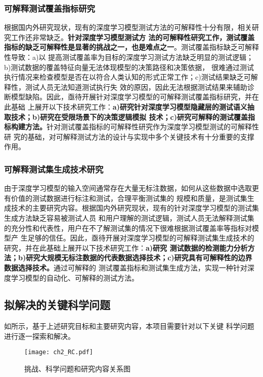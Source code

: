 \subsubsection{可解释测试覆盖指标研究}
根据国内外研究现状，现有的深度学习模型测试方法的可解释性十分有限，相关研究工作还非常缺乏。\textbf{针对深度学习模型测试方
    法的可解释性研究工作，测试覆盖指标的缺乏可解释性是显著的挑战之一，也是难点之一}。测试覆盖指标缺乏可解释性导致：a)以
提高测试覆盖率为目标的深度学习测试方法缺乏明显的测试逻辑；b)测试数据的覆盖特征向量无法体现模型的决策路径和决策依据，
很难通过测试执行情况来检查模型是否在以符合人类认知的形式正常工作；c)测试结果缺乏可解释性，测试人员无法知道测试执行失
效的原因，因此无法根据测试结果来辅助诊断模型缺陷。因此，亟待开展针对深度学习模型的可解释测试覆盖指标研究，并在此基础
上展开以下技术研究工作：\textbf{a)研究针对深度学习模型隐藏层的测试语义抽取技术；b)研究在受限场景下的决策逻辑模拟
    技术；c)研究可解释的测试覆盖指标构建方法。}针对测试覆盖指标的可解释性研究作为深度学习模型测试的可解释性研
究的基础，对可解释测试方法的设计与实现中多个关键技术有十分重要的支撑作用。

\subsubsection{可解释测试集生成技术研究}
由于深度学习模型的输入空间通常存在大量无标注数据，如何从这些数据中选取更有价值的测试数据进行标注和测试，合理平衡测试集的
规模和质量，是测试集生成技术的主要研究内容。根据国内外研究现状，现有的针对深度学习模型的测试集生成方法缺乏容易被测试人员
和用户理解的测试逻辑，测试人员无法解释测试集的充分性和代表性，用户在不了解测试集的情况下很难根据测试覆盖率等指标对模型产
生足够的信任。因此，亟待开展对深度学习模型的可解释测试集生成技术的研究，并在此基础上展开以下技术研究工作：\textbf{a)研究
    测试数据的检测能力分析方法；b)研究大规模无标注数据的代表数据选择技术；c)研究具有可解释性的边界数据选择技术。}通过可解释的
    测试覆盖指标和测试集生成方法，实现一种针对深度学习模型的自动化、可解释的测试方法。


\subsection{拟解决的关键科学问题}

如所示，基于上述研究目标和主要研究内容，本项目需要针对以下关键
科学问题进行逐一探索和解决。

\begin{figure}[htp]
    \begin{small}
        \begin{center}
            \texttt{[image: ch2\_RC.pdf]}
        \end{center}
        \caption{挑战、科学问题和研究内容关系图}
        \label{fig:ch2:rc}
    \end{small}
\end{figure}

